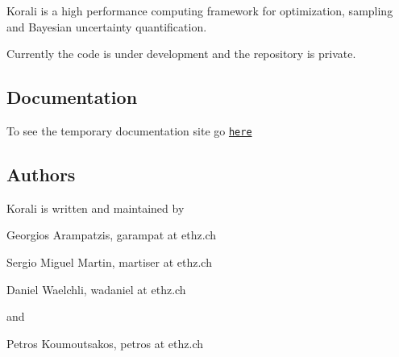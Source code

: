 Korali is a high performance computing framework for optimization, sampling and Bayesian uncertainty quantification.

Currently the code is under development and the repository is private.

\subsection*{Documentation}

To see the temporary documentation site go \href{https://www.cse-lab.ethz.ch/skorali-jws815jpgw/}{\tt here}

\subsection*{Authors}

Korali is written and maintained by
\begin{DoxyItemize}
\item Georgios Arampatzis, garampat at ethz.\-ch
\item Sergio Miguel Martin, martiser at ethz.\-ch
\item Daniel Waelchli, wadaniel at ethz.\-ch
\end{DoxyItemize}

and


\begin{DoxyItemize}
\item Petros Koumoutsakos, petros at ethz.\-ch 
\end{DoxyItemize}